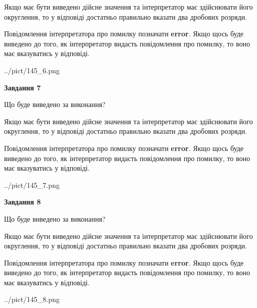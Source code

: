 \documentclass[12pt, ukrainian]{article}
\begin{document}
{\begin {Large}
Якщо має бути виведено дійсне значення та інтерпретатор має здійснювати його округлення, 
то у відповіді достатньо правильно вказати два дробових розряди.

Повідомлення інтерпретатора про помилку позначати \textbf{error}.
Якщо щось буде виведено до того, як інтерпретатор видасть повідомлення про помилку, 
то воно має вказуватись у відповіді. \par

\begin{center}
	{../pict/145_6.png}
\end{center}
\newpage

{\begin {center}\textbf{Завдання 7}\end {center}}\par
Що буде виведено за виконання? \par

Якщо має бути виведено дійсне значення та інтерпретатор має здійснювати його округлення, 
то у відповіді достатньо правильно вказати два дробових розряди.

Повідомлення інтерпретатора про помилку позначати \textbf{error}.
Якщо щось буде виведено до того, як інтерпретатор видасть повідомлення про помилку, 
то воно має вказуватись у відповіді. \par

\begin{center}
	{../pict/145_7.png}
\end{center}
\newpage

{\begin {center}\textbf{Завдання 8}\end {center}}\par
Що буде виведено за виконання? \par

Якщо має бути виведено дійсне значення та інтерпретатор має здійснювати його округлення, 
то у відповіді достатньо правильно вказати два дробових розряди.

Повідомлення інтерпретатора про помилку позначати \textbf{error}.
Якщо щось буде виведено до того, як інтерпретатор видасть повідомлення про помилку, 
то воно має вказуватись у відповіді. \par

\begin{center}
	{../pict/145_8.png}
\end{center}
\newpage


\end{Large}}
\end{document}
